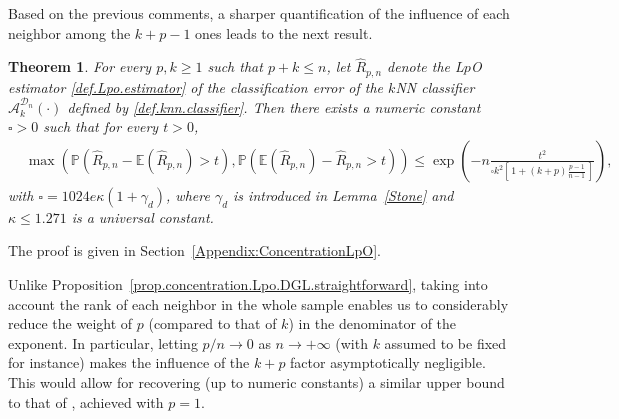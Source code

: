 \documentclass[twoside,11pt]{article}
\numberwithin{equation}{section}
\newcommand{\prob}[1]{\mathbb{P}\left(#1 \right)}
\newcommand{\1}{\mathds{1}}%
\newcommand{\paren}[1]{\left( #1 \right)}
\newcommand{\croch}[1]{\left[\, #1 \,\right]}
\newcommand{\E}{\mathbb{E}}
\newcommand{\Rh}{\widehat{R}}
\newcommand{\Dn}{\mathcal{D}_n}
\newcommand{\A}{\mathcal{A}}
\numberwithin{equation}{section}
\theoremstyle{plain}
\newtheorem{thm}{Theorem}[section]
\begin{document}
Based on the previous comments, a sharper quantification of the influence of each neighbor among the $k+p-1$ ones leads to the next result.
%
\begin{thm}\label{Prop : ConcentrationLpO}
For every $p,k\geq 1$ such that $p + k \leq n$, let $\Rh_{p,n}$ denote the L$p$O estimator \eqref{def.Lpo.estimator} of the classification error of the $k$NN classifier $\A_k^{\Dn}(\cdot)$ defined by \eqref{def.knn.classifier}.
%
Then there exists a numeric constant $\square>0$ such that for every $t>0$,
%
{\small
\begin{align*}
 & \max\paren{\prob{  \Rh_{p,n} - \E\paren{ \Rh_{p,n} }  > t  } ,  \prob{ \E\paren{ \Rh_{p,n} } - \Rh_{p,n} > t  } }   \leq  \exp \paren{ -  n \frac{  t^2 }{  \square k^2 \croch{1 + (k+p)\frac{p-1}{n-1}} } }  ,
\end{align*}}
%
with $\square = 1024 e\kappa (1+\gamma_d )$, where $\gamma_d$ is introduced in Lemma~\ref{Stone} and $\kappa\leq 1.271$ is a universal constant.
\end{thm}
%
The proof is given in Section~\ref{Appendix:ConcentrationLpO}.

Unlike Proposition~\ref{prop.concentration.Lpo.DGL.straightforward}, taking into account the rank of each neighbor in the whole sample enables us to considerably reduce the weight of $p$ (compared to that of $k$) in the denominator of the exponent.
%
In particular, letting $p/n\to 0$ as $n\to +\infty$ (with $k$ assumed to be fixed for instance) makes the influence of the $k+p$ factor asymptotically negligible. This would allow for recovering (up to numeric constants) a similar upper bound to that of \citet[][Theorem~24.4]{DeGyLu_1996}, achieved with $p=1$.


\medskip
\end{document}
